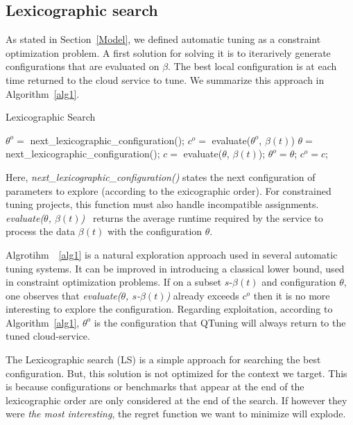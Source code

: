 \documentclass[10pt, conference, compsocconf]{IEEEtran}
\begin{document}
\subsection{Lexicographic search}

As stated in Section~\ref{Model}, we defined automatic tuning as a constraint optimization problem. 
A first solution for solving it is to iterarively generate configurations that are evaluated on 
$\beta$. The best local configuration is at each time returned to the cloud service to tune. 
We summarize this approach in Algorithm~\ref{alg1}.

	\begin{algorithm}                    
	\caption{\scriptsize Lexicographic Search } 	\label{alg1}  
	\begin{algorithmic}[1]
	\scriptsize
	\STATE $\theta^o = $ next\_lexicographic\_configuration(); 
	\STATE $c^o = $ evaluate($\theta^o$, $\beta(t)$)
	\STATE $\theta = $ next\_lexicographic\_configuration(); 
		\STATE $c = $ evaluate($\theta$, $\beta(t)$);
			\STATE $\theta^o = \theta$; $c^o = c$;
		\ENDIF
	\ENDWHILE
	\end{algorithmic}
	\end{algorithm}
	\normalsize

Here, {\it next\_lexicographic\_configuration()} states the next configuration of parameters to explore (according to the 
exicographic order). For constrained tuning projects, this function must also handle incompatible assignments. 
 {\it evaluate($\theta$, $\beta(t)$) } returns the average runtime required by the 
service to process the data  $\beta(t)$ with the configuration $\theta$. 

Algrotihm~ \ref{alg1} is a natural exploration approach used in several automatic tuning systems. It can be improved 
in introducing a classical lower bound, 
used in constraint optimization problems. If on a subset $s$-$\beta(t)$ and configuration $\theta$, one observes that 
{\it evaluate($\theta$, $s$-$\beta(t)$)} already exceeds $c^o$ then it is no more interesting to explore the configuration. 
Regarding exploitation, according to Algorithm~\ref{alg1}, $\theta^o$ is the configuration that QTuning will always 
return to the tuned cloud-service. 

The Lexicographic search (LS) is a simple approach for searching the best configuration. But, this solution is not optimized for 
the context we target. This is because configurations or benchmarks that appear at the end of the lexicographic order 
are only considered at the end of the search. If however they were {\it the most interesting}, the regret function  
we want to minimize will explode.
\end{document}
